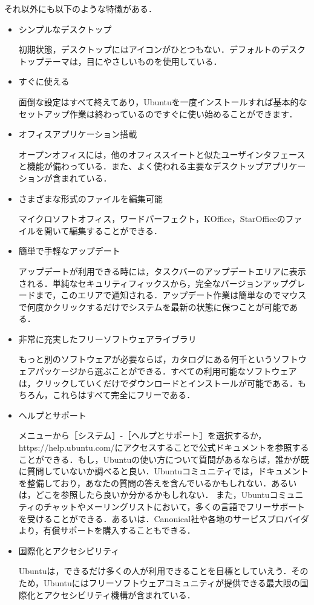 それ以外にも以下のような特徴がある．
\begin{itemize}
  \item シンプルなデスクトップ

初期状態，デスクトップにはアイコンがひとつもない．デフォルトのデスクトップテーマは，目にやさしいものを使用している．

  \item すぐに使える

面倒な設定はすべて終えてあり，Ubuntuを一度インストールすれば基本的なセットアップ作業は終わっているのですぐに使い始めることができます．

  \item オフィスアプリケーション搭載

オープンオフィスには，他のオフィススイートと似たユーザインタフェースと機能が備わっている．また、よく使われる主要なデスクトップアプリケーションが含まれている．
　
  \item さまざまな形式のファイルを編集可能

マイクロソフトオフィス，ワードパーフェクト，KOffice，StarOfficeのファイルを開いて編集することができる．

  \item 簡単で手軽なアップデート

アップデートが利用できる時には，タスクバーのアップデートエリアに表示される．単純なセキュリティフィックスから，完全なバージョンアップグレードまで，このエリアで通知される．アップデート作業は簡単なのでマウスで何度かクリックするだけでシステムを最新の状態に保つことが可能である．

  \item 非常に充実したフリーソフトウェアライブラリ

もっと別のソフトウェアが必要ならば，カタログにある何千というソフトウェアパッケージから選ぶことができる．すべての利用可能なソフトウェアは，クリックしていくだけでダウンロードとインストールが可能である．もちろん，これらはすべて完全にフリーである．

  \item ヘルプとサポート

メニューから［システム］-［ヘルプとサポート］を選択するか，https://help.ubuntu.com/にアクセスすることで公式ドキュメントを参照することができる．もし，Ubuntuの使い方について質問があるならば，誰かが既に質問していないか調べると良い．Ubuntuコミュニティでは，ドキュメントを整備しており，あなたの質問の答えを含んでいるかもしれない．あるいは，どこを参照したら良いか分かるかもしれない．
また，Ubuntuコミュニティのチャットやメーリングリストにおいて，多くの言語でフリーサポートを受けることができる．あるいは．Canonical社や各地のサービスプロバイダより，有償サポートを購入することもできる．

  \item 国際化とアクセシビリティ

Ubuntuは，できるだけ多くの人が利用できることを目標としていえう．そのため，Ubuntuにはフリーソフトウェアコミュニティが提供できる最大限の国際化とアクセシビリティ機構が含まれている\cite{tokutyou}．


\end{itemize}
